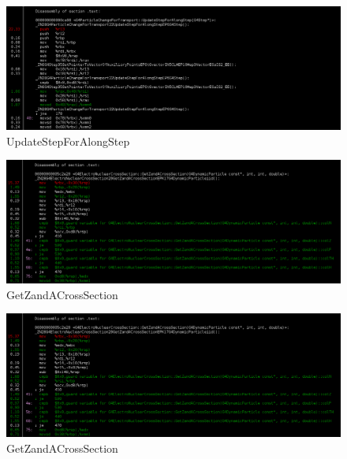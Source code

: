 \documentclass[a4paper]{jpconf}
\begin{document}
\begin{appendices}
\begin{figure}[H]
\begin{center}
\includegraphics[scale=0.33]{images/UpdateForAlongStep_P8.png}
\caption{UpdateStepForAlongStep}
\end{center}
\end{figure}

\begin{figure}[H]
\begin{center}
\includegraphics[scale=0.33]{images/GetZandACrossSection_P8.png}
\caption{GetZandACrossSection}
\end{center}
\end{figure}

\begin{figure}[H]
\begin{center}
\includegraphics[scale=0.33]{images/GetZandACrossSection_P8.png}
\caption{GetZandACrossSection}
\end{center}
\end{figure}


\end{appendices}
\end{document}
